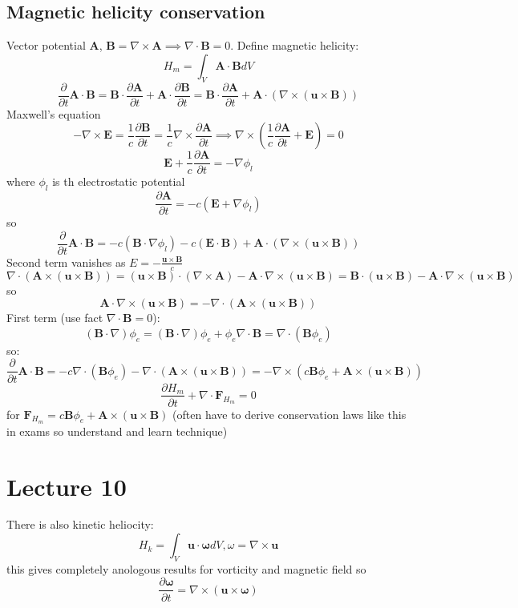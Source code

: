 \documentclass{article}
\begin{document}
\subsection{Magnetic helicity conservation}
Vector potential $\bm A$, $\bm B = \nabla \times \bm A \implies \nabla \cdot \bm B = 0$. Define magnetic helicity:
$$
H_m = \int_V \bm A \cdot \bm B dV
$$
$$
\frac{\partial}{\partial t} \bm A \cdot \bm B = \bm B \cdot \frac{\partial \bm A}{\partial t} + \bm A \cdot \frac{\partial \bm B}{\partial t} = \bm B \cdot \frac{\partial \bm A}{\partial t} + \bm A \cdot ( \nabla \times (\bm u \times \bm B))
$$
Maxwell's equation
$$
- \nabla \times \bm E = \frac{1}{c} \frac{\partial \bm B}{\partial t} = \frac{1}{c} \nabla \times \frac{\partial \bm A}{\partial t} \implies \nabla \times( \frac{1}{c} \frac{\partial \bm A}{\partial t} + \bm E) = 0
$$
$$
\bm E + \frac{1}{c}\frac{\partial \bm A}{\partial t} = - \nabla \phi_l
$$
where $\phi_l$ is th electrostatic potential
$$
\frac{\partial \bm A}{\partial t} = -c(\bm E + \nabla \phi_l)
$$
so 
$$
\frac{\partial }{\partial t} \bm A \cdot \bm B = - c(\bm B \cdot \nabla \phi_l) - c (\bm E \cdot \bm B) + \bm A \cdot (\nabla \times( \bm u \times \bm B))
$$
Second term vanishes as $E = - \frac{\bm u \times \bm B}{c}$ 
$$
\nabla \cdot (\bm A \times (\bm u \times \bm B)) = (\bm u \times \bm B) \cdot (\nabla \times \bm A) - \bm A \cdot \nabla \times (\bm u \times \bm B) = \bm B \cdot (\bm u \times \bm B) - \bm A \cdot \nabla \times (\bm u \times \bm B)
$$
so
$$
\bm A \cdot \nabla \times(\bm u \times \bm B) = - \nabla \cdot (\bm A \times (\bm u \times \bm B))
$$
First term (use fact $\nabla \cdot \bm B = 0$):
$$
(\bm B \cdot \nabla) \phi_e = (\bm B \cdot \nabla) \phi_e + \phi_e \nabla \cdot \bm B = \nabla \cdot(\bm B \phi_e)
$$
so:
$$
\frac{\partial}{\partial t} \bm A \cdot \bm B = - c \nabla \cdot (\bm B \phi_e) - \nabla \cdot (\bm A \times (\bm u \times \bm B)) = - \nabla \times (c \bm B \phi_e + \bm A \times (\bm u \times \bm B))
$$
\begin{equation}
        \frac{\partial H_m}{\partial t} + \nabla \cdot \bm F_{H_m} = 0
\end{equation}
for $\bm F_{H_m} = c \bm B \phi_e + \bm A \times (\bm u \times \bm B)$
(often have to derive conservation laws like this in exams so understand and learn technique)
\section{Lecture 10}
There is also kinetic heliocity:
$$
H_k = \int_V \bm u \cdot \bm \omega dV, \omega = \nabla \times \bm u
$$
this gives completely anologous results for vorticity and magnetic field so
$$
\frac{\partial\bm \omega}{\partial t} = \nabla \times (\bm u \times \bm \omega)
$$
\end{document}
